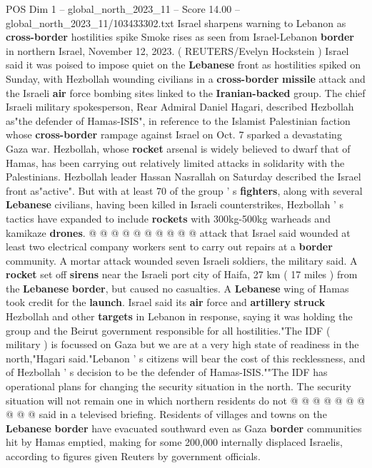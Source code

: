 \begin{textsample}{POS Dim 1 – global\_north\_2023\_11 – Score 14.00 – global\_north\_2023\_11/103433302.txt}  \label{ex:f1_pos_358}
Israel sharpens warning to Lebanon as \textbf{cross-border} hostilities spike Smoke rises as seen from Israel-Lebanon \textbf{border} in northern Israel, November 12, 2023. ( REUTERS/Evelyn Hockstein ) Israel said it was poised to impose quiet on the \textbf{Lebanese} front as hostilities spiked on Sunday, with Hezbollah wounding civilians in a \textbf{cross-border} \textbf{missile} attack and the Israeli \textbf{air} force bombing sites linked to the \textbf{Iranian-backed} group.
The chief Israeli military spokesperson, Rear Admiral Daniel Hagari, described Hezbollah as"the defender of Hamas-ISIS", in reference to the Islamist Palestinian faction whose \textbf{cross-border} rampage against Israel on Oct. 7 sparked a devastating Gaza war.
Hezbollah, whose \textbf{rocket} arsenal is widely believed to dwarf that of Hamas, has been carrying out relatively limited attacks in solidarity with the Palestinians.
Hezbollah leader Hassan Nasrallah on Saturday described the Israel front as"active".
But with at least 70 of the group ' s \textbf{fighters}, along with several \textbf{Lebanese} civilians, having been killed in Israeli counterstrikes, Hezbollah ' s tactics have expanded to include \textbf{rockets} with 300kg-500kg warheads and kamikaze \textbf{drones}. @ @ @ @ @ @ @ @ @ @ attack that Israel said wounded at least two electrical company workers sent to carry out repairs at a \textbf{border} community.
A mortar attack wounded seven Israeli soldiers, the military said.
A \textbf{rocket} set off \textbf{sirens} near the Israeli port city of Haifa, 27 km ( 17 miles ) from the \textbf{Lebanese} \textbf{border}, but caused no casualties.
A \textbf{Lebanese} wing of Hamas took credit for the \textbf{launch}.
Israel said its \textbf{air} force and \textbf{artillery} \textbf{struck} Hezbollah and other \textbf{targets} in Lebanon in response, saying it was holding the group and the Beirut government responsible for all hostilities."The IDF ( military ) is focussed on Gaza but we are at a very high state of readiness in the north,"Hagari said."Lebanon ' s citizens will bear the cost of this recklessness, and of Hezbollah ' s decision to be the defender of Hamas-ISIS.""The IDF has operational plans for changing the security situation in the north.
The security situation will not remain one in which northern residents do not @ @ @ @ @ @ @ @ @ @ said in a televised briefing.
Residents of villages and towns on the \textbf{Lebanese} \textbf{border} have evacuated southward even as Gaza \textbf{border} communities hit by Hamas emptied, making for some 200,000 internally displaced Israelis, according to figures given Reuters by government officials.

\end{textsample}
